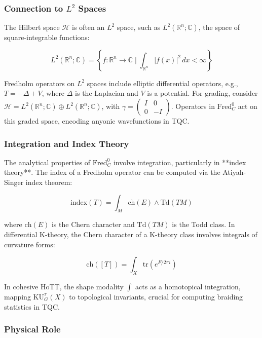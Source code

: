 \documentclass{article}
\theoremstyle{definition}
\begin{document}
\subsubsection{Connection to \(L^2\) Spaces}

The Hilbert space \(\mathscr{H}\) is often an \(L^2\) space, such as \(L^2(\mathbb{R}^n; \mathbb{C})\), the space of square-integrable functions:

\[
L^2(\mathbb{R}^n; \mathbb{C}) = \left\{ f: \mathbb{R}^n \to \mathbb{C} \mid \int_{\mathbb{R}^n} |f(x)|^2 \, dx < \infty \right\}
\]

Fredholm operators on \(L^2\) spaces include elliptic differential operators, e.g., \(T = -\Delta + V\), where \(\Delta\) is the Laplacian and \(V\) is a potential. For grading, consider \(\mathscr{H} = L^2(\mathbb{R}^n; \mathbb{C}) \oplus L^2(\mathbb{R}^n; \mathbb{C})\), with \(\gamma = \begin{pmatrix} I & 0 \\ 0 & -I \end{pmatrix}\). Operators in \(\text{Fred}^0_C\) act on this graded space, encoding anyonic wavefunctions in TQC.

\subsubsection{Integration and Index Theory}

The analytical properties of \(\text{Fred}^0_C\) involve integration, particularly in **index theory**. The index of a Fredholm operator can be computed via the Atiyah-Singer index theorem:

\begin{equation}
\text{index}(T) = \int_M \text{ch}(E) \wedge \text{Td}(TM)
\end{equation}

where \(\text{ch}(E)\) is the Chern character and \(\text{Td}(TM)\) is the Todd class. In differential K-theory, the Chern character of a K-theory class involves integrals of curvature forms:

\begin{equation}
\text{ch}([T]) = \int_X \text{tr}(e^{F/2\pi i})
\end{equation}

In cohesive HoTT, the shape modality \(\int\) acts as a homotopical integration, mapping \(\mathrm{KU}^\tau_G(X)\) to topological invariants, crucial for computing braiding statistics in TQC.

\subsubsection{Physical Role}
\end{document}
